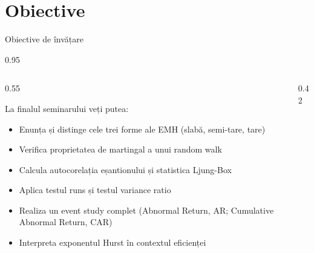\documentclass[9pt, aspectratio=169, t]{beamer}
\begin{document}
\section{Obiective}

\begin{frame}{Obiective de învățare}
    \begin{cminipage}{0.95\textwidth}
\begin{columns}[T]
\begin{column}{0.55\textwidth}
\begin{block}{La finalul seminarului veți putea:}
\begin{itemize}\setlength{\itemsep}{0pt}
    \item Enunța și distinge cele trei forme ale EMH (slabă, semi-tare, tare)
    \item Verifica proprietatea de martingal a unui random walk
    \item Calcula autocorelația eșantionului și statistica Ljung-Box
    \item Aplica testul runs și testul variance ratio
    \item Realiza un event study complet (Abnormal Return, AR; Cumulative Abnormal Return, CAR)
    \item Interpreta exponentul Hurst în contextul eficienței
\end{itemize}
\end{block}
\end{column}
\begin{column}{0.42\textwidth}
\begin{center}
\end{center}
\end{column}
\end{columns}
    \end{cminipage}
\end{frame}
\end{document}
